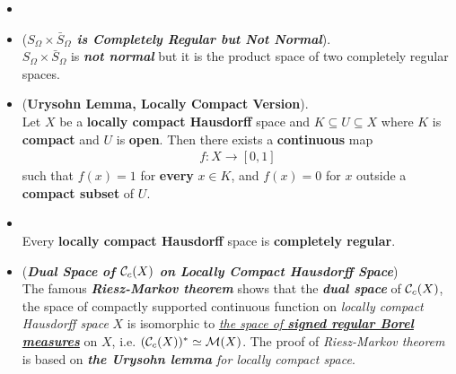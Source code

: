 \documentclass[11pt]{article}
\begin{document}
\begin{itemize}
\item {}

\item \begin{example} (\emph{\textbf{$S_{\Omega}\times \bar{S}_{\Omega}$ is Completely Regular but Not Normal}}).\\
$S_{\Omega}\times \bar{S}_{\Omega}$ is \emph{\textbf{not normal}} but it is the product space of two completely regular spaces.
\end{example}

\item \begin{theorem}  (\textbf{Urysohn Lemma, Locally Compact Version}). \citep{folland2013real}\\ 
Let $X$ be a \textbf{locally compact Hausdorff} space and $K \subseteq U \subseteq X$ where $K$ is \textbf{compact} and $U$ is \textbf{open}.  Then there exists a \textbf{continuous} map
\begin{align*}
f : X \rightarrow [0, 1]
\end{align*}
such that $f(x) = 1$ for \textbf{every} $x \in K$, and $f(x) = 0$ for $x$ outside a \textbf{compact subset} of $U$.
\end{theorem}

\item \begin{corollary}\citep{folland2013real}\\ 
Every \textbf{locally compact Hausdorff} space is \textbf{completely regular}.
\end{corollary}

\item \begin{remark} (\emph{\textbf{Dual Space of ${\mathcal C}_{c}(X)$ on Locally Compact Hausdorff Space}}) \citep{reed1980methods, folland2013real} \\
The famous \emph{\textbf{Riesz-Markov theorem}} shows that  the \emph{\textbf{dual space}} of ${\mathcal C}_{c}(X)$, the space of compactly supported continuous function on \emph{locally compact Hausdorff space} $X$ is isomorphic to \underline{\emph{the space of \textbf{signed regular Borel measures}}} on $X$, i.e. $({\mathcal C}_c(X))^{*} \simeq {\mathcal M}(X)$. The proof of \emph{Riesz-Markov theorem} is based on \emph{\textbf{the Urysohn lemma} for locally compact space}.
\end{remark}
\end{itemize}
\end{document}
